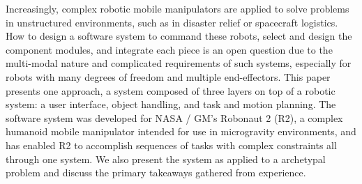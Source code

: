 Increasingly, complex robotic mobile manipulators are applied to solve problems in unstructured environments, such as in disaster relief or spacecraft logistics.
How to design a software system to command these robots, select and design the component modules, and integrate each piece is an open question due to the multi-modal nature and complicated requirements of such systems, especially for robots with many degrees of freedom and multiple end-effectors.
This paper presents one approach, a system composed of three layers on top of a robotic system: a user interface, object handling, and task and motion planning.
The software system was developed for NASA / GM's Robonaut 2 (R2), a complex humanoid mobile manipulator intended for use in microgravity environments, and has enabled R2 to accomplish sequences of tasks with complex constraints all through one system. 
We also present the system as applied to a archetypal problem and discuss the primary takeaways gathered from experience.
